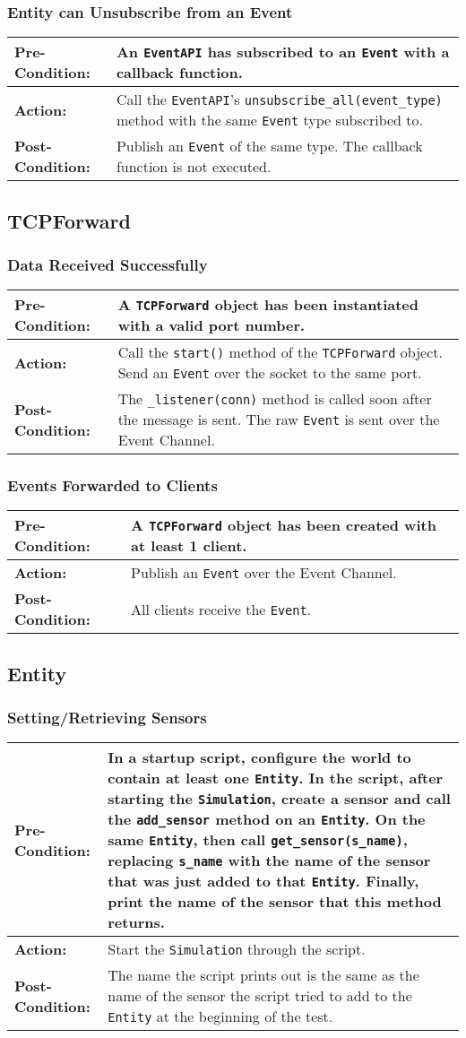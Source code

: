 \documentclass[titlepage]{article}
\newcommand{\testcase}[3]{
    \begin{center}
    \begin{tabular}{| l | p{0.7\textwidth}|}
        \hline
        \rowcolor[gray]{0.8}\textbf{Pre-Condition:} & #1 \\ \hline
        \textbf{Action:} & #2 \\ \hline
        \rowcolor[gray]{0.8}\textbf{Post-Condition:} & #3 \\ \hline
    \end{tabular}
    \end{center}
}
\begin{document}
\subsubsection{Entity can Unsubscribe from an Event}
\testcase{An \texttt{EventAPI} has subscribed to an \texttt{Event} with a callback function.}{Call the \texttt{EventAPI}'s \texttt{unsubscribe\_all(event\_type)} method with the same \texttt{Event} type subscribed to.}{Publish an \texttt{Event} of the same type. The callback function is not executed.}

\subsection{TCPForward}
\subsubsection{Data Received Successfully}
\testcase{A \texttt{TCPForward} object has been instantiated with a valid port number.}{Call the \texttt{start()} method of the \texttt{TCPForward} object. Send an \texttt{Event} over the socket to the same port. }{The \texttt{\_listener(conn)} method is called soon after the message is sent. The raw \texttt{Event} is sent over the Event Channel. }

\subsubsection{Events Forwarded to Clients}
\testcase{A \texttt{TCPForward} object has been created with at least 1 client.}{Publish an \texttt{Event} over the Event Channel.}{All clients receive the \texttt{Event}.}

\subsection{Entity}
\subsubsection{Setting/Retrieving Sensors}
\testcase{In a startup script, configure the world to contain at least one \texttt{Entity}. In the script, after starting the \texttt{Simulation}, create a sensor and call the \texttt{add\_sensor} method on an \texttt{Entity}.  On the same \texttt{Entity}, then call \texttt{get\_sensor(s\_name)}, replacing \texttt{s\_name} with the name of the sensor that was just added to that \texttt{Entity}.  Finally, print the name of the sensor that this method returns.}{Start the \texttt{Simulation} through the script.}{The name the script prints out is the same as the name of the sensor the script tried to add to the \texttt{Entity} at the beginning of the test.}
\end{document}
